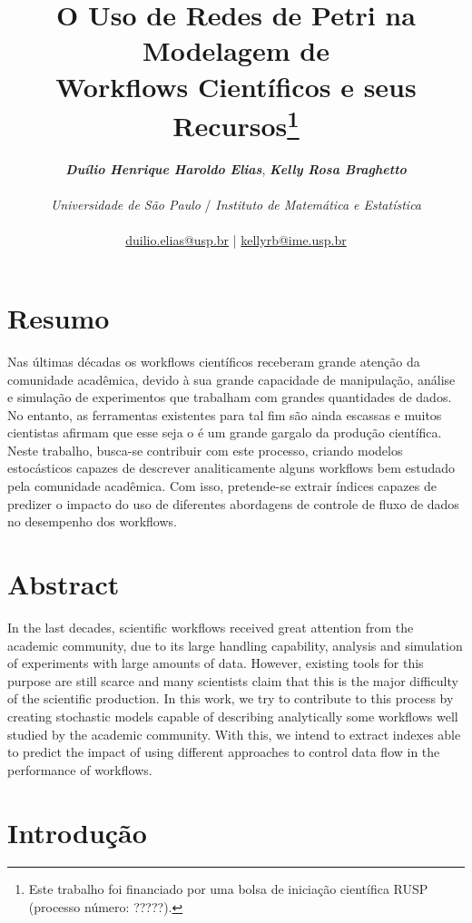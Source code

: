\documentclass[a4paper,10pt]{article}
\date{}
\title{
    O Uso de Redes de Petri na Modelagem de \\Workflows Científicos e seus Recursos\footnote{Este trabalho foi financiado por uma bolsa de iniciação científica RUSP (processo número: ?????).}
}
\author{
\textbf{\textit{Duílio Henrique Haroldo Elias}},\textbf{ \textit{Kelly Rosa Braghetto}}\\
\\
\textit{Universidade de São Paulo} / \textit{Instituto de Matemática e Estatística}\\
\\
\href{mailto:duilio.elias@usp.br}{duilio.elias@usp.br} | \href{mailto:kellyrb@ime.usp.br}{kellyrb@ime.usp.br}
}
\begin{document}
\maketitle
    
\section*{Resumo}
	Nas últimas décadas os workflows científicos receberam grande atenção da comunidade acadêmica, devido à sua grande
capacidade de manipulação, análise e simulação de experimentos que trabalham com grandes quantidades de dados. No entanto,
as ferramentas existentes para tal fim são ainda escassas e muitos cientistas afirmam que esse seja o é um grande gargalo da produção científica. Neste trabalho, busca-se contribuir com este processo, criando modelos estocásticos capazes de descrever analiticamente alguns workflows bem estudado pela comunidade acadêmica. Com isso, pretende-se extrair índices capazes de predizer o impacto do uso de diferentes abordagens de controle de fluxo de dados no desempenho dos workflows.

\section*{Abstract}

In the last decades, scientific workflows received great attention from the academic community, due to its large handling capability, analysis and simulation of experiments with large amounts of data. However, existing tools for this purpose are still scarce and many scientists claim that this is the major difficulty of the  scientific production. In this work, we try to contribute to this process by creating stochastic models capable of describing analytically some workflows well studied by the academic community. With this, we intend to extract indexes able to predict the impact of using different approaches to control data flow in the performance of workflows.

\thispagestyle{fancy}

\newpage

\section*{Introdução}
\end{document}
